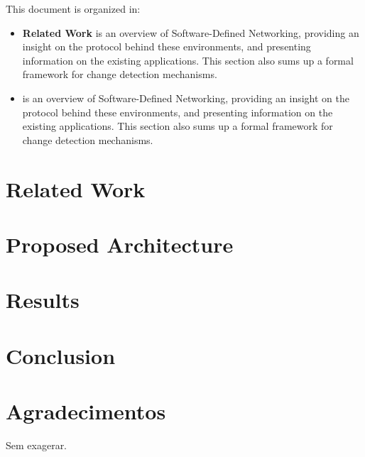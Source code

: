 \documentclass[a4paper]{IEEEtran}
\begin{document}
\par This document is organized in:

\begin{itemize}
    \item \textbf{Related Work} is an overview of Software-Defined Networking, providing an insight on the protocol behind these environments,
and presenting information on the existing applications. This section also sums up a formal framework for change detection mechanisms.

    \item \textbf{} is an overview of Software-Defined Networking, providing an insight on the protocol behind these environments,
and presenting information on the existing applications. This section also sums up a formal framework for change detection mechanisms.
\end{itemize}

\section{Related Work}
\section{Proposed Architecture}
\section{Results}
\section{Conclusion}
\section*{Agradecimentos}

Sem exagerar.




\end{document}
